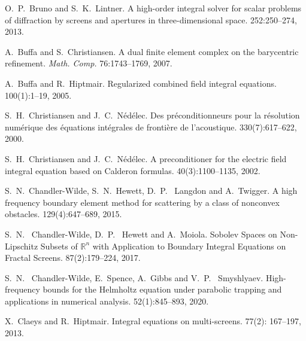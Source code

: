 \documentclass[]{report}
\begin{document}
\begin{small}
\begin{thebibliography}{0}
		O.~P.~Bruno and S.~K.~Lintner.
		A high-order integral solver for scalar problems of diffraction by screens and apertures in three-dimensional space.
		 252:250--274, 2013.


		A.~Buffa and S.~Christiansen.
		\newblock A dual finite element complex on the
		barycentric refinement.
      	{\em Math. Comp.} 76:1743--1769, 2007.

                
		A.~Buffa and R.~Hiptmair.
		\newblock Regularized combined field integral equations.
		 100(1):1--19, 2005.	
		
		S.~H.~Christiansen and J.~C.~Nédélec.
		\newblock Des préconditionneurs pour la résolution numérique des équations intégrales de frontière de l'acoustique.
		  330(7):617--622, 2000.
		
		S.~H.~Christiansen and J.~C.~Nédélec.
		\newblock A preconditioner for the electric field integral equation based on Calderon formulas.
		  40(3):1100--1135, 2002.
		
		S.~N.~Chandler-Wilde, S.~N.~Hewett, D.~P.~ Langdon and A.~Twigger.
		\newblock A high frequency boundary element method for scattering by a class of nonconvex obstacles.
		 129(4):647--689, 2015.
		
		S.~N.~ Chandler-Wilde, D.~P.~ Hewett and A.~Moiola.
		\newblock Sobolev Spaces on Non-Lipschitz Subsets of ${\mathbb {R}}^n$ with Application to Boundary Integral Equations on Fractal Screens. 
		 87(2):179--224, 2017.
		
		S.~N.~ Chandler-Wilde, E.~Spence, A.~Gibbs and V.~P.~ Smyshlyaev.
		\newblock High-frequency bounds for the Helmholtz equation under parabolic trapping and applications in numerical analysis.
		 52(1):845--893, 2020.	
		
		X.~Claeys and R.~Hiptmair.
		\newblock Integral equations on multi-screens.
		 77(2): 167--197, 2013.
		

\end{thebibliography}
\end{small}
\end{document}
